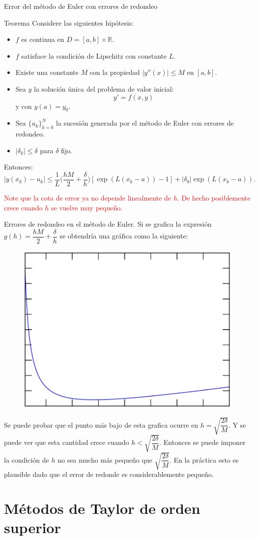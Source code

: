 \begin{frame}{Error del método de Euler con errores de redondeo}
\small
\begin{block}{Teorema}
Considere las siguientes hipótesis:
\begin{itemize}
\item $f$ es continua en $D=[a,b]\times \mathbb{R}$.
\item $f$ satisface la condición de Lipschitz con constante $L$.
\item Existe una constante $M$ con la propiedad $|y''(x)|\leq M$ en $[a,b]$.
\item Sea $y$ la solución única del problema de valor inicial:
$$y'=f(x,y)$$
y con $y(a)=y_0.$ 
\item Sea  $\{u_k\}_{k=0}^{N}$ la sucesión generada por el método de Euler con errores de redondeo.
\item $|\delta_k|\leq \delta$ para $\delta$ fijo. 
\end{itemize}
Entonces:
$$|y(x_k)-u_k|\leq \dfrac{1}{L}\bigg(\dfrac{hM}{2}+\dfrac{\delta}{h}\bigg)[\exp(L(x_k-a))-1]+|\delta_0|\exp(L(x_k-a)).$$
\end{block}
\textcolor{red}{Note que la cota de error ya no depende linealmente de $h$. De hecho posiblemente crece cuando $h$ se vuelve muy pequeño.}
\end{frame}
\begin{frame}{Errores de redondeo en el método de Euler.}
\small
Si se grafica la expresión $g(h)=\dfrac{hM}{2}+\dfrac{\delta}{h}$ se obtendría una gráfica como la siguiente:
\begin{figure}[H]
\centering 
\includegraphics[scale=0.3]{TerceraUnidad/Imagen14}
\end{figure}
Se puede probar que el punto más bajo de esta grafica ocurre en $h=\sqrt{\dfrac{2\delta}{M}}$. Y se puede ver que esta cantidad crece cuando $h<\sqrt{\dfrac{2\delta}{M}}$. Entonces se puede imponer la condición de $h$ no sea mucho más pequeño que $\sqrt{\dfrac{2\delta}{M}}$. En la práctica esto es plausible dado que el error de redonde es considerablemente pequeño.
\section{Métodos de Taylor de orden superior}
\end{frame}
